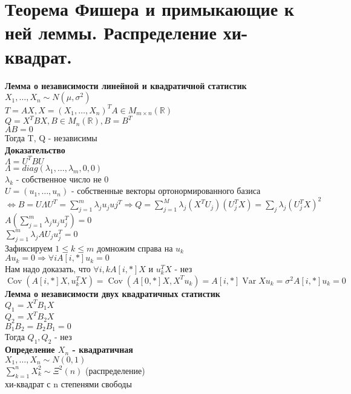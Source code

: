 \documentclass{article}
\newcommand\0{\mathbb{0}}
\DeclareMathOperator{\Var}{Var}
\DeclareMathOperator{\Cov}{Cov}
\newcommand\1{\mathbb{1}}
\newcommand{\Rto}{\Rightarrow}
\newcommand{\LRto}{\Leftrightarrow}
\begin{document}
\section{Теорема Фишера и примыкающие к ней леммы. Распределение хи-квадрат.}
\textbf{Лемма о независимости линейной и квадратичной статистик}\\
$X_1, \dots, X_n \sim N(\mu, \sigma^2)$\\
$T = AX, X = (X_1, \dots, X_n)^T A \in M_{m \times n}(\mathbb{R})$\\
$Q = X^T B X, B \in M_n(\mathbb{R}), B = B^T$\\
$AB = 0$\\
Тогда T, Q - независимы\\
\textbf{Доказательство}\\
$\Lambda = U^TBU$\\
$\Lambda = diag(\lambda_1, \dots, \lambda_m, 0, 0)$\\
$\lambda_k$ - собственное число не 0\\
$U = (u_1, \dots, u_n)$ - собственные векторы ортонормированного базиса $\LRto B = U\Lambda U^T = \displaystyle\sum_{j = 1}^m \lambda_j u_j uj^T \Rto Q = \displaystyle\sum_{j = 1}^M \lambda_j (X^TU_j)(U_j^TX) = \displaystyle\sum_j \lambda_j (U_j^T X)^2$\\
$A(\displaystyle\sum_{j = 1}^m \lambda_j u_j u_j^T) = 0$\\
$\displaystyle\sum_{j = 1}^m \lambda_j A U_j u_j^T = 0$\\
Зафиксируем $1 \leq k \leq m$ домножим справа на $u_k$\\
$Au_k = 0 \Rto \forall i A[i, *]u_k = 0$\\
Нам надо доказать, что $\forall i, k A[i, *]X$ и $u_k^TX$ - нез\\
$\Cov(A[i, *]X, u_k^TX) = \Cov(A[0, *]X, X^Tu_k) = A[i, *] \Var X u_k = \sigma^2 A[i, *]u_k = 0$\\
\textbf{Лемма о независимости двух квадратичных статистик}\\
$Q_1 = X^T B_1 X$\\
$Q_2 = X^TB_2X$\\
$B_1 B_2 = B_2 B_1 = 0$\\
Тогда $Q_1, Q_2$ - нез\\
\textbf{Определение $X_n$ - квадратичная}\\
$X_1, \dots, X_n \sim N(0, 1)$\\
$\displaystyle\sum_{k = 1}^{n}X_k^2 \sim \Xi^2(n)$ (распределение)\\
хи-квадрат с n степенями свободы\\
\end{document}
